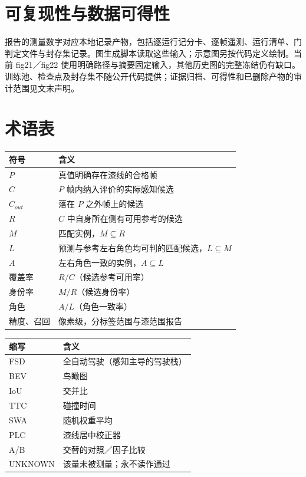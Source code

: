 \documentclass[journal]{IEEEtran}
\begin{document}
\section*{可复现性与数据可得性}
报告的测量数字对应本地记录产物，包括逐运行记分卡、逐帧遥测、运行清单、门判定文件与封存集记录。图生成脚本读取这些输入；示意图另按代码定义绘制。当前 fig21／fig22 使用明确路径与摘要固定输入，其他历史图的完整冻结仍有缺口。训练池、检查点及封存集不随公开代码提供；证据归档、可得性和已删除产物的审计范围见文末声明。
\section*{术语表}
\begin{table}[!t]
\centering
\begin{tabular}{@{}ll@{}}
\toprule
符号 & 含义 \\
\midrule
$P$ & 真值明确存在漆线的合格帧 \\
$C$ & $P$ 帧内纳入评价的实际感知候选 \\
$C_{out}$ & 落在 $P$ 之外帧上的候选 \\
$R$ & $C$ 中自身所在侧有可用参考的候选 \\
$M$ & 匹配实例，$M \subseteq R$ \\
$L$ & 预测与参考左右角色均可判的匹配候选，$L \subseteq M$ \\
$A$ & 左右角色一致的实例，$A \subseteq L$ \\
覆盖率 & $R/C$（候选参考可用率） \\
身份率 & $M/R$（候选身份率） \\
角色 & $A/L$（角色一致率） \\
精度、召回 & 像素级，分标签范围与漆范围报告 \\
\bottomrule
\end{tabular}
\end{table}
\begin{table}[!t]
\centering
\begin{tabular}{@{}ll@{}}
\toprule
缩写 & 含义 \\
\midrule
FSD & 全自动驾驶（感知主导的驾驶栈） \\
BEV & 鸟瞰图 \\
IoU & 交并比 \\
TTC & 碰撞时间 \\
SWA & 随机权重平均 \\
PLC & 漆线居中校正器 \\
A/B & 交替的对照／因子比较 \\
UNKNOWN & 该量未被测量；永不读作通过 \\
\bottomrule
\end{tabular}
\end{table}
\end{document}
